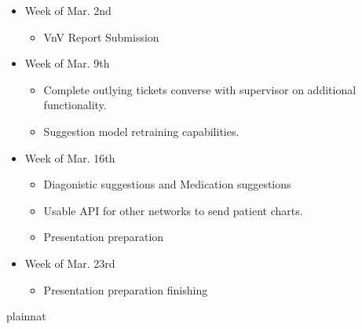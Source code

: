 \documentclass[12pt, titlepage]{article}
\begin{document}
\begin{itemize}
  \item Week of Mar. 2nd
    \begin{itemize}
      \item VnV Report Submission
    \end{itemize}
  \item Week of Mar. 9th
    \begin{itemize}
      \item Complete outlying tickets converse with supervisor on additional functionality.
      \item Suggestion model retraining capabilities.
    \end{itemize}
  \item Week of Mar. 16th
    \begin{itemize}
      \item Diagonistic suggestions and Medication suggestions
      \item Usable API for other networks to send patient charts.
      \item Presentation preparation
    \end{itemize}
  \item Week of Mar. 23rd
    \begin{itemize}
      \item Presentation preparation finishing
    \end{itemize}
\end{itemize}

 {plainnat}


\newpage{}
\end{document}
